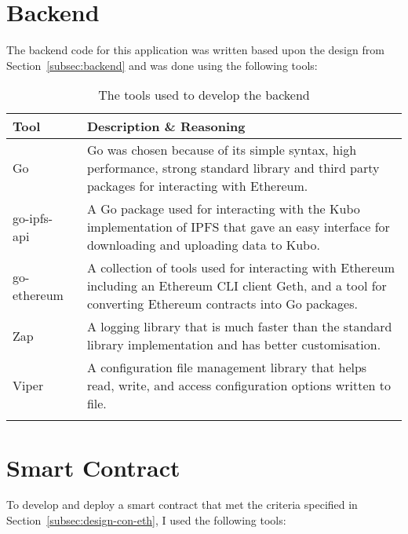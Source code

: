 
\section{Backend}

The backend code for this application was written based upon the design from Section~\ref{subsec:backend} and was done using the following tools:

\begin{longtable}{p{} p{}}
  \toprule
  \textbf{Tool} & \textbf{Description \& Reasoning}
  \\\midrule\midrule
  Go~\cite{noauthor_go_nodate}
  & Go was chosen because of its simple syntax, high performance, strong standard library and third party packages for interacting with Ethereum.
  \\
  go-ipfs-api~\cite{noauthor_go-ipfs-api_2023}
  & A Go package used for interacting with the Kubo implementation of IPFS that gave an easy interface for downloading and uploading data to Kubo.\\
  go-ethereum~\cite{noauthor_go-ethereum_nodate}
  & A collection of tools used for interacting with Ethereum including an Ethereum CLI client Geth, and a tool for converting Ethereum contracts into Go packages.\\
  Zap~\cite{noauthor_zap_2023}
  & A logging library that is much faster than the standard library implementation and has better customisation. \\
  Viper~\cite{noauthor_viper_nodate}
  & A configuration file management library that helps read, write, and access configuration options written to file.
  \\\bottomrule\bottomrule
  \caption{The tools used to develop the backend}
\end{longtable}

\section{Smart Contract}

To develop and deploy a smart contract that met the criteria specified in Section~\ref{subsec:design-con-eth}, I used the following tools:

